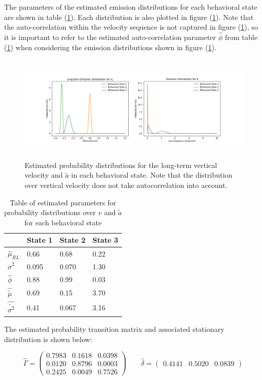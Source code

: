 The parameters of the estimated emission distributions for each behavioral state are shown in table (\ref{table:emis_dist}). Each distribution is also plotted in figure (\ref{fig:emis_dist}). Note that the auto-correlation within the velocity sequence is not captured in figure (\ref{fig:emis_dist}), so it is important to refer to the estimated auto-correlation parameter $\hat \phi$ from table (\ref{table:emis_dist}) when considering the emission distributions shown in figure (\ref{fig:emis_dist}).
%
\begin{figure}[h!]
	\centering
	\includegraphics[height=2in]{../Plots/emis_dist.png}
	\caption{Estimated probability distributions for the long-term vertical velocity and $\tilde a$ in each behavioral state. Note that the distribution over vertical velocity does not take autocorrelation into account.}
	\label{fig:emis_dist}
\end{figure}
%
\begin{table}[h!]
	\centering
	\begin{tabular}{l|lll}
		& State 1 & State 2 & State 3 \\ \hline
		$\hat \mu_{RL}$        & 0.66    & 0.68    & 0.22    \\
		$\hat \sigma^2$        & 0.095   & 0.070   & 1.30    \\
		$\hat \phi$            & 0.88    & 0.99    & 0.03    \\ \hline
		$\hat \tilde \mu$      & 0.69    & 0.15    & 3.70    \\
		$\hat \tilde{\sigma^2}$ & 0.41    & 0.067   & 3.16   
	\end{tabular}
	\caption{Table of estimated parameters for probability distributions over $v$ and $\tilde a$ for each behavioral state}
	\label{table:emis_dist}
\end{table}
%
The estimated probability transition matrix and associated stationary distribution is shown below:

$$\hat \Gamma = \begin{pmatrix} 
0.7983 & 0.1618 & 0.0398 \\
0.0120 & 0.8796 & 0.0003 \\
0.2425 & 0.0049 & 0.7526
\end{pmatrix} \qquad \hat \delta = \begin{pmatrix} 0.4141 & 0.5020 & 0.0839 \end{pmatrix}$$

